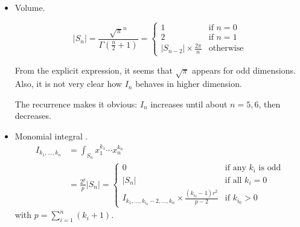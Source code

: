 \documentclass[draft]{scrartcl}
\begin{document}
\begin{itemize}
  \item Volume.

\begin{equation}\label{ndimball}
  |S_n|
  = \frac{\sqrt{\pi}^n}{\Gamma(\frac{n}{2}+1)}
  = \begin{cases}
     1&\text{if $n = 0$}\\
     2&\text{if $n = 1$}\\
     |S_{n-2}| \times \frac{2\pi}{n}&\text{otherwise}
  \end{cases}
\end{equation}

From the explicit expression, it seems that $\sqrt{\pi}$ appears for odd dimensions.
Also, it is not very clear how $I_n$ behaves in higher dimension.

The recurrence makes it obvious: $I_n$ increases until about $n=5,6$, then decreases.

\item Monomial integral \cite{folland}.
\begin{equation}
  \begin{split}
    I_{k_1,\dots,k_n}
    &= \int_{S_n} x_1^{k_1}\cdots x_n^{k_n}\\
    &= \frac{2^p}{p} |S_n|
    =\begin{cases}
      0&\text{if any $k_i$ is odd}\\
      |S_n|&\text{if all $k_i=0$}\\
      I_{k_1,\dots,k_{i_0}-2,\dots,k_n} \times \frac{(k_{i_0} - 1) r^2}{p - 2}&\text{if $k_{i_0} > 0$}
    \end{cases}
  \end{split}
\end{equation}
with $p=\sum_{i=1}^n (k_i+1)$.
\end{itemize}
\end{document}
